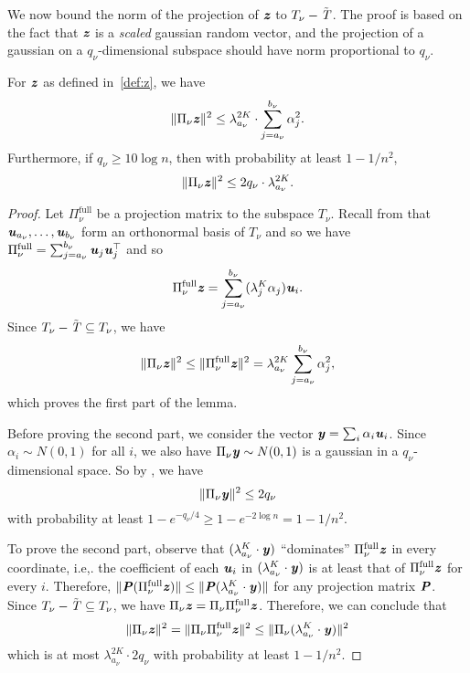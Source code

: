 We now bound the norm of the projection of $\boldsymbol{\mathit{z}}$ to $T_\nu - {\tilde{\mathit{T}}}$. The proof is based on the fact that $\boldsymbol{\mathit{z}}$ is a {\it scaled} gaussian random vector, and the projection of a gaussian on a $q_{\nu}$-dimensional subspace should have norm proportional to $q_{\nu}$. 
\begin{proposition}\label{lem:projZ}
For $\boldsymbol{\mathit{z}}$ as defined in~\eqref{def:z}, we have
\[
\|\Pi_{\nu}\boldsymbol{\mathit{z}}\|^2 \leq \lambda_{a_{\nu}}^{2K} \cdot \sum_{j=a_{\nu}}^{b_{\nu}}\alpha_j^2.
\] 
Furthermore, if $q_{\nu}\geq 10 \log n$, then with probability at least $1-1/n^2$,
\[
\|\Pi_{\nu}\boldsymbol{\mathit{z}}\|^2 \leq 2q_{\nu}\cdot \lambda_{a_{\nu}}^{2K}.
\]
\end{proposition}
\begin{proof}
Let $\Pi_{\nu}^{\text{full}}$ be a projection matrix to the subspace $T_{\nu}$. Recall from  that $\boldsymbol{\mathit{u}}_{a_{\nu}},\dots,\boldsymbol{\mathit{u}}_{b_{\nu}}$ form an orthonormal basis of $T_\nu$ and so we have $\Pi_{\nu}^{\text{full}}=\sum_{j=a_{\nu}}^{b_{\nu}}\boldsymbol{\mathit{u}}_{j}\boldsymbol{\mathit{u}}_{j}^{\top}$ and so $$\Pi_{\nu}^{\text{full}}\boldsymbol{\mathit{z}}=\sum_{j=a_{\nu}}^{b_{\nu}}(\lambda_{j}^{K}\alpha_{j})\boldsymbol{\mathit{u}}_{i}.$$ Since $T_{\nu}-{\tilde{\mathit{T}}}\subseteq T_{\nu}$, we have 
\[
\|\Pi_{\nu}\boldsymbol{\mathit{z}}\|^{2}\le\|\Pi_{\nu}^{\text{full}}\boldsymbol{\mathit{z}}\|^{2} = \lambda_{a_{\nu}}^{2K}\sum_{j=a_{\nu}}^{b_{\nu}}\alpha_{j}^{2},
\]
which proves the first part of the lemma. 

Before proving the second part, we consider the vector $\boldsymbol{\mathit{y}}=\sum_{i}\alpha_{i}\boldsymbol{\mathit{u}}_{i}$. Since $\alpha_{i}\sim N(0,1)$ for all $i$, we also have $\Pi_{\nu}\boldsymbol{\mathit{y}}\sim N(0,1)$ is a gaussian in a $q_{\nu}$-dimensional space. So by , we have
\[
\|\Pi_{\nu}\boldsymbol{\mathit{y}}\|^{2}\le2q_{\nu}
\]
with probability at least $1-e^{-q_{\nu}/4}\ge1-e^{-2\log n}=1-1/n^{2}$. 

To prove the second part, observe that $(\lambda_{a_{\nu}}^{K}\cdot\boldsymbol{\mathit{y}})$ ``dominates'' $\Pi_{\nu}^{\text{full}}\boldsymbol{\mathit{z}}$ in every coordinate, i.e,. the coefficient of each $\boldsymbol{\mathit{u}}_{i}$ in $(\lambda_{a_{\nu}}^{K}\cdot\boldsymbol{\mathit{y}})$ is at least that of $\Pi_{\nu}^{\text{full}}\boldsymbol{\mathit{z}}$ for every $i$. Therefore, $\|\boldsymbol{\mathit{P}}(\Pi_{\nu}^{\text{full}}\boldsymbol{\mathit{z}})\|\le\|\boldsymbol{\mathit{P}}(\lambda_{a_{\nu}}^{K}\cdot\boldsymbol{\mathit{y}})\|$ for any projection matrix $\boldsymbol{\mathit{P}}$. Since $T_{\nu}-{\tilde{\mathit{T}}}\subseteq T_{\nu}$, we have $\Pi_{\nu}\boldsymbol{\mathit{z}}=\Pi_{\nu}\Pi_{\nu}^{\text{full}}\boldsymbol{\mathit{z}}$. Therefore, we can conclude that 
\[
\|\Pi_{\nu}\boldsymbol{\mathit{z}}\|^{2}=\|\Pi_{\nu}\Pi_{\nu}^{\text{full}}\boldsymbol{\mathit{z}}\|^{2}\le\|\Pi_{\nu}(\lambda_{a_{\nu}}^{K}\cdot\boldsymbol{\mathit{y}})\|^{2}
\]
which is at most $\lambda_{a_{\nu}}^{2K}\cdot2q_{\nu}$ with probability at least $1-1/n^{2}$. \qedhere
\end{proof}
